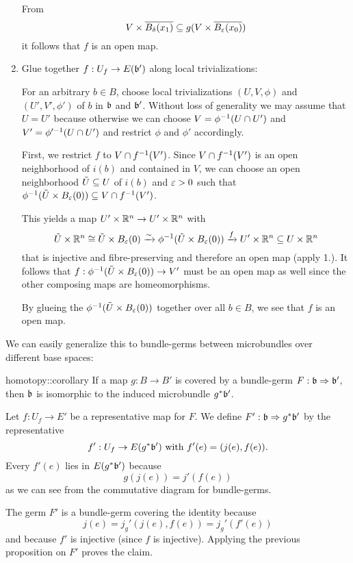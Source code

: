 \begin{myproof}
\begin{enumerate}
        From
        \[ V \times \clball[\delta][x_1] \sub g(V \times \clball[\eps][x_0]) \]
        it follows that $f$ is an open map.

        \item Glue together $f: U_f \to E(\mathfrak{b}')$ along local trivializations:

        For an arbitrary $b \in B$, choose local trivializations $(U, V, \phi)$ and $(U', V', \phi')$ of $b$ in $\mathfrak{b}$ and $\mathfrak{b}'$.
        Without loss of generality we may assume that $U = U'$ because otherwise we can choose $V = \phi^{-1}(U \cap U')$ and $V' = \phi'^{-1}(U \cap U')$
        and restrict $\phi$ and $\phi'$ accordingly.   
        
        First, we restrict $f$ to $V \cap f^{-1}(V')$. Since $V \cap f^{-1}(V')$ is an open neighborhood of $i(b)$ and contained in $V$, we can choose
        an open neighborhood $\tilde{U} \subseteq{} U$ of $i(b)$ and $\varepsilon{} > 0$ such that $\inv{\phi}(\tilde{U} \times \ball[\eps]) \sub V \cap \inv{f}(V')$.
        
        This yields a map $U' \times \mathbb{R}^n \to U' \times \mathbb{R}^n$ with
        \[ \tilde{U} \times \R^n \cong  \tilde{U} \times \ball[\eps] \isomto \inv{\phi}(\tilde{U} \times \ball[\eps]) \xto{f} U' \times \R^n \sub U \times \R^n \]
        that is injective and fibre-preserving and therefore an open map (apply 1.).
        It follows that $f: \inv{\phi}(\tilde{U} \times \ball[\eps]) \to V'$ must be an open map as well since the other composing maps are homeomorphisms.

        By glueing the $\inv{\phi}(\tilde{U} \times \ball[\eps])$ together over all $b \in B$, we see that $f$ is an open map.
    \end{enumerate}
\end{myproof}

\begin{myparagraph}
    We can easily generalize this to bundle-germs between microbundles over different base spaces:
\end{myparagraph}

\begin{mycorollary}{homotopy::corollary}{}
    If a map $g: B \to B'$ is covered by a bundle-germ $F: \mathfrak{b} \Rightarrow{} \mathfrak{b}'$, then $\mathfrak{b}$ is isomorphic to the induced microbundle $g^*\mathfrak{b}'$.
\end{mycorollary}

\begin{myproof}
    Let $f: U_f \to E'$ be a representative map for $F$.
    We define $F': \mathfrak{b} \Rightarrow{} g^*\mathfrak{b}'$ by the representative
    \[ f': U_f \to E(g^*\mathfrak{b}') \text{ with } f'(e) = (j(e), f(e)). \]
    Every $f'(e)$ lies in $E(g^*\mathfrak{b}')$ because
    \[ g(j(e)) = j'(f(e)) \]
    as we can see from the commutative diagram for bundle-germs.

    The germ $F'$ is a bundle-germ covering the identity because
    \[ j(e) = j_g'(j(e), f(e)) = j_g'(f'(e)) \]
    and because $f'$ is injective (since $f$ is injective).
    Applying the previous proposition on $F'$ proves the claim.
\end{myproof}